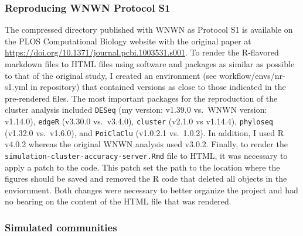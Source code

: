 \documentclass[
]{article}
\begin{document}
\hypertarget{reproducing-wnwn-protocol-s1}{%
\subsubsection{Reproducing WNWN Protocol
S1}\label{reproducing-wnwn-protocol-s1}}

The compressed directory published with WNWN as Protocol S1 is available
on the PLOS Computational Biology website with the original paper at
\url{https://doi.org/10.1371/journal.pcbi.1003531.s001}. To render the
R-flavored markdown files to HTML files using software and packages as
similar as possible to that of the original study, I created an
environment (see workflow/envs/nr-s1.yml in repository) that contained
versions as close to those indicated in the pre-rendered files. The most
important packages for the reproduction of the cluster analysis included
\texttt{DESeq} (my version: v1.39.0 vs.~WNWN version: v1.14.0),
\texttt{edgeR} (v3.30.0 vs.~v3.4.0), \texttt{cluster} (v2.1.0 vs
v1.14.4), \texttt{phyloseq} (v1.32.0 vs.~v1.6.0), and \texttt{PoiClaClu}
(v1.0.2.1 vs.~1.0.2). In addition, I used R v4.0.2 whereas the original
WNWN analysis used v3.0.2. Finally, to render the
\texttt{simulation-cluster-accuracy-server.Rmd} file to HTML, it was
necessary to apply a patch to the code. This patch set the path to the
location where the figures should be saved and removed the R code that
deleted all objects in the enviornment. Both changes were necessary to
better organize the project and had no bearing on the content of the
HTML file that was rendered.

\hypertarget{simulated-communities}{%
\subsubsection{Simulated communities}\label{simulated-communities}}
\end{document}

